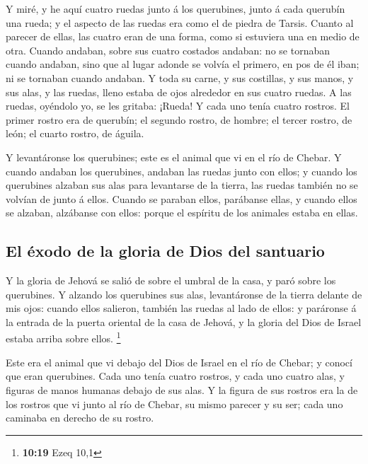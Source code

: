  Y miré, y he aquí cuatro ruedas junto á los querubines,
junto á cada querubín una rueda; y el aspecto de las ruedas era como el
de piedra de Tarsis.  Cuanto al parecer de ellas, las
cuatro eran de una forma, como si estuviera una en medio de otra.
 Cuando andaban, sobre sus cuatro costados andaban: no se
tornaban cuando andaban, sino que al lugar adonde se volvía el primero,
en pos de él iban; ni se tornaban cuando andaban.  Y toda
su carne, y sus costillas, y sus manos, y sus alas, y las ruedas, lleno
estaba de ojos alrededor en sus cuatro ruedas.  A las
ruedas, oyéndolo yo, se les gritaba: ¡Rueda!  Y cada uno
tenía cuatro rostros. El primer rostro era de querubín; el segundo
rostro, de hombre; el tercer rostro, de león; el cuarto rostro, de
águila.

 Y levantáronse los querubines; este es el animal que vi
en el río de Chebar.  Y cuando andaban los querubines,
andaban las ruedas junto con ellos; y cuando los querubines alzaban sus
alas para levantarse de la tierra, las ruedas también no se volvían de
junto á ellos.  Cuando se paraban ellos, parábanse ellas,
y cuando ellos se alzaban, alzábanse con ellos: porque el espíritu de
los animales estaba en ellas.

\hypertarget{el-uxe9xodo-de-la-gloria-de-dios-del-santuario}{%
\subsection{El éxodo de la gloria de Dios del
santuario}\label{el-uxe9xodo-de-la-gloria-de-dios-del-santuario}}

 Y la gloria de Jehová se salió de sobre el umbral de la
casa, y paró sobre los querubines.  Y alzando los
querubines sus alas, levantáronse de la tierra delante de mis ojos:
cuando ellos salieron, también las ruedas al lado de ellos: y paráronse
á la entrada de la puerta oriental de la casa de Jehová, y la gloria del
Dios de Israel estaba arriba sobre ellos. \footnote{\textbf{10:19} Ezeq
  10,1}

 Este era el animal que vi debajo del Dios de Israel en
el río de Chebar; y conocí que eran querubines.  Cada uno
tenía cuatro rostros, y cada uno cuatro alas, y figuras de manos humanas
debajo de sus alas.  Y la figura de sus rostros era la de
los rostros que vi junto al río de Chebar, su mismo parecer y su ser;
cada uno caminaba en derecho de su rostro.

